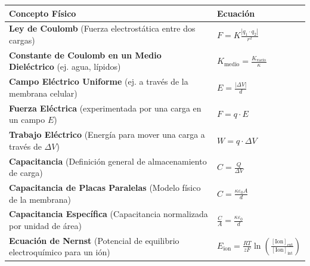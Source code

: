 \documentclass[11pt,letterpaper]{article}
\begin{document}
\renewcommand{\arraystretch}{2}
\begin{tabularx}{\textwidth}{|>{\raggedright\arraybackslash}X|>{\centering\arraybackslash}X|}
\hline
\textbf{Concepto Físico} & \textbf{Ecuación} \\
\hline
\textbf{Ley de Coulomb} (Fuerza electrostática entre dos cargas) & $F = K \frac{|q_1 \cdot q_2|}{r^2}$ \\
\hline
\textbf{Constante de Coulomb en un Medio Dieléctrico} (ej. agua, lípidos) & $K_{\text{medio}} = \frac{K_{\text{vacío}}}{\kappa}$ \\
\hline
\textbf{Campo Eléctrico Uniforme} (ej. a través de la membrana celular) & $E = \frac{|\Delta V|}{d}$ \\
\hline
\textbf{Fuerza Eléctrica} (experimentada por una carga en un campo $E$) & $F = q \cdot E$ \\
\hline
\textbf{Trabajo Eléctrico} (Energía para mover una carga a través de $\Delta V$) & $W = q \cdot \Delta V$ \\
\hline
\textbf{Capacitancia} (Definición general de almacenamiento de carga) & $C = \frac{Q}{\Delta V}$ \\
\hline
\textbf{Capacitancia de Placas Paralelas} (Modelo físico de la membrana) & $C = \frac{\kappa \varepsilon_0 A}{d}$ \\
\hline
\textbf{Capacitancia Específica} (Capacitancia normalizada por unidad de área) & $\frac{C}{A} = \frac{\kappa \varepsilon_0}{d}$ \\
\hline
\textbf{Ecuación de Nernst} (Potencial de equilibrio electroquímico para un ión) & $E_{\text{ion}} = \frac{RT}{zF} \ln\left( \frac{[\text{Ion}]_{\text{ext}}}{[\text{Ion}]_{\text{int}}} \right)$ \\
\hline
\end{tabularx}

\vspace{0.5cm}
\end{document}
